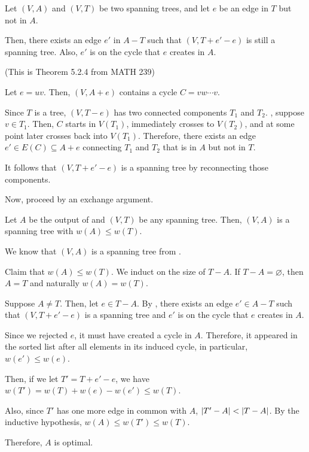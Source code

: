 \begin{claim}\label{claim:g:3}
  Let $(V, A)$ and $(V, T)$ be two spanning trees,
  and let $e$ be an edge in $T$ but not in $A$.
  
  Then, there exists an edge $e'$ in $A - T$ such that
  $(V, T + e' - e)$ is still a spanning tree.
  Also, $e'$ is on the cycle that $e$ creates in $A$.

  (This is Theorem 5.2.4 from MATH 239)
\end{claim}
\begin{prf}
  Let $e = uv$. Then, $(V,A+e)$ contains a cycle $C = vw\cdots v$.

  Since $T$ is a tree, $(V,T-e)$ has two connected components $T_1$ and $T_2$.
  \WLOG, suppose $v \in T_1$.
  Then, $C$ starts in $V(T_1)$, immediately crosses to $V(T_2)$,
  and at some point later crosses back into $V(T_1)$.
  Therefore, there exists an edge $e' \in E(C) \subseteq A+e$ connecting $T_1$ and $T_2$
  that is in $A$ but not in $T$.

  It follows that $(V,T+e'-e)$ is a spanning tree by reconnecting those components.
\end{prf}

Now, proceed by an exchange argument.

\begin{prop}
  Let $A$ be the output of  and $(V,T)$ be any spanning tree.
  Then, $(V,A)$ is a spanning tree with $w(A) \leq w(T)$.
\end{prop}
\begin{prf}
  We know that $(V,A)$ is a spanning tree from .

  Claim that $w(A) \leq w(T)$. We induct on the size of $T - A$.
  If $T - A = \varnothing$, then $A = T$ and naturally $w(A) = w(T)$.

  Suppose $A \neq T$. Then, let $e \in T - A$.
  By , there exists an edge $e' \in A - T$
  such that $(V, T+e'-e)$ is a spanning tree and $e'$ is on the cycle that $e$ creates in $A$.

  Since we rejected $e$, it must have created a cycle in $A$.
  Therefore, it appeared in the sorted list after all elements in its induced cycle,
  in particular, $w(e') \leq w(e)$.

  Then, if we let $T' = T + e' - e$,
  we have $w(T') = w(T) + w(e) - w(e') \leq w(T)$.

  Also, since $T'$ has one more edge in common with $A$,
  $\abs{T' - A} < \abs{T - A}$.
  By the inductive hypothesis, $w(A) \leq w(T') \leq w(T)$.

  Therefore, $A$ is optimal.
\end{prf}

